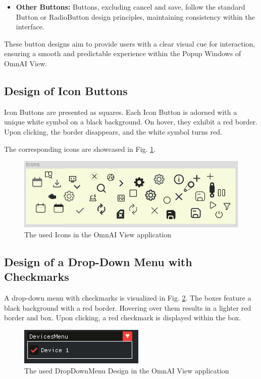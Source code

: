 \documentclass[]{scrreprt}
\begin{document}
\begin{itemize}
\begin{itemize}
    \item \textbf{Other Buttons:} Buttons, excluding cancel and save, follow the standard Button or RadioButton design principles, maintaining consistency within the interface.
\end{itemize}


These button designs aim to provide users with a clear visual cue for interaction, ensuring a smooth and predictable experience within the Popup Windows of OmnAI View.


\subsection{Design of Icon Buttons}


Icon Buttons are presented as squares. Each Icon Button is adorned with a unique white symbol on a black background. On hover, they exhibit a red border. Upon clicking, the border disappears, and the white symbol turns red.


The corresponding icons are showcased in Fig. \ref{fig: IconImages}.


\begin{figure}
    \includegraphics[width=.7\textwidth]{assets/pictures/Icons.png}
    \caption[]{The used Icons in the OmnAI View application}
    \label{fig: IconImages}
\end{figure}


\subsection{Design of a Drop-Down Menu with Checkmarks}


A drop-down menu with checkmarks is visualized in Fig. \ref{fig: DragandDropwithCheckmarks}. The boxes feature a black background with a red border. Hovering over them results in a lighter red border and box. Upon clicking, a red checkmark is displayed within the box.


\begin{figure}
    \includegraphics[width=.5\textwidth]{assets/pictures/DropDownMenu.png}
    \caption[]{The used DropDownMenu Design in the OmnAI View application}
    \label{fig: DragandDropwithCheckmarks}
\end{figure}



\end{itemize}
\end{document}
